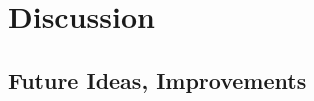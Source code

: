\chapter{Discussion}
\label{chap:discussion}


\section{Future Ideas, Improvements}
\label{sec:future}

